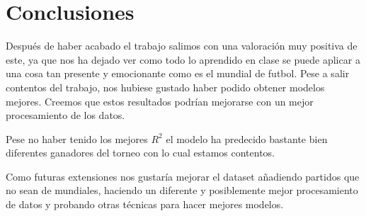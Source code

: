 \section{Conclusiones}
Después de haber acabado el trabajo salimos con una valoración muy positiva de este, ya que nos ha dejado ver como todo lo aprendido en clase se puede aplicar a una cosa tan presente y emocionante como es el mundial de futbol. Pese a salir contentos del trabajo, nos hubiese gustado haber podido obtener modelos mejores. Creemos que estos resultados podrían mejorarse con un mejor procesamiento de los datos.
\newline

Pese no haber tenido los mejores $R^2$ el modelo ha predecido bastante bien diferentes ganadores del torneo con lo cual estamos contentos.
\newline

Como futuras extensiones nos gustaría mejorar el dataset añadiendo partidos que no sean de mundiales, haciendo un diferente y posiblemente mejor procesamiento de datos y probando otras técnicas para hacer mejores modelos.
\newpage